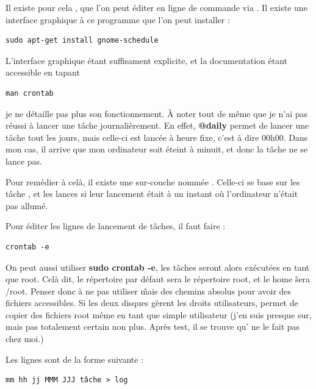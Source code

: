 \documentclass[a4paper,twoside]{article}
\begin{document}
Il existe pour cela , que l'on peut éditer en ligne de commande via . Il existe une interface graphique à ce programme que l'on peut installer :

\begin{verbatim}
sudo apt-get install gnome-schedule
\end{verbatim}

L'interface graphique étant suffisament explicite, et la documentation étant accessible en tapant

\begin{verbatim}
man crontab
\end{verbatim}

je ne détaille pas plus son fonctionnement. À noter tout de même que je n'ai pas réussi à lancer une tâche journalièrement. En effet, \textbf{@daily} permet de lancer une tâche tout les jours, mais celle-ci est lancée à heure fixe, c'est à dire 00h00. Dans mon cas, il arrive que mon ordinateur soit éteint à minuit, et donc la tâche ne se lance pas.

Pour remédier à celà, il existe une \og sur-couche \fg nommée . Celle-ci se base sur les tâche , et les lances si leur lancement était à un instant où l'ordinateur n'était pas allumé.

Pour éditer les lignes de lancement de tâches, il faut faire :

\begin{verbatim}
crontab -e
\end{verbatim}

\begin{remarque}
On peut aussi utiliser \textbf{sudo crontab -e}, les tâches seront alors exécutées en tant que root. Celà dit, le répertoire par défaut sera le répertoire root, et le home \~ sera /root. Penser donc à ne pas utiliser \~ mais des chemins absolus pour avoir des fichiers accessibles. Si les deux disques gèrent les droits utilisateurs,  permet de copier des fichiers root même en tant que simple utilisateur (j'en suis presque sur, mais pas totalement certain non plus. Après test, il se trouve qu' ne le fait pas chez moi.)
\end{remarque}

Les lignes sont de la forme suivante :

\begin{verbatim}
mm hh jj MMM JJJ tâche > log
\end{verbatim}
\end{document}
